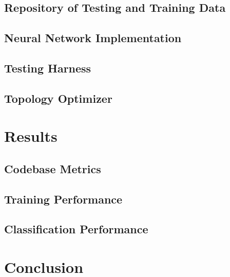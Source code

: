 \documentclass{report}
\begin{document}
\subsection{Repository of Testing and Training Data}

\subsection{Neural Network Implementation}

\subsection{Testing Harness}

\subsection{Topology Optimizer}


\section{Results}

\subsection{Codebase Metrics}


\subsection{Training Performance}


\subsection{Classification Performance}


\section{Conclusion}
\end{document}
